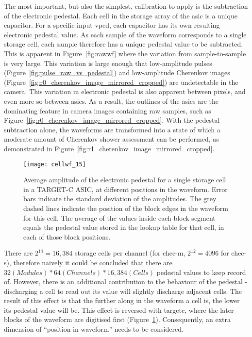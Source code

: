 The most important, but also the simplest, calibration to apply is the subtraction of the electronic pedestal. Each cell in the storage array of the \gls{asic} is a unique capacitor. For a specific input \gls{vped}, each capacitor has its own resulting electronic pedestal value. As each sample of the waveform corresponds to a single storage cell, each sample therefore has a unique pedestal value to be subtracted. This is apparent in Figure~\ref{fig:rawwf} where the variation from sample-to-sample is very large. This variation is large enough that low-amplitude pulses (Figure~\ref{fig:pulse_raw_vs_pedestal}) and low-amplitude Cherenkov images (Figure~\ref{fig:r0_cherenkov_image_mirrored_cropped}) are undetectable in the camera. This variation in electronic pedestal is also apparent between pixels, and even more so between \glspl{asic}. As a result, the outlines of the \glspl{asic} are the dominating feature in camera images containing raw samples, such as Figure~\ref{fig:r0_cherenkov_image_mirrored_cropped}. With the pedestal subtraction alone, the waveforms are transformed into a state of which a moderate amount of Cherenkov shower assessment can be performed, as demonstrated in Figure~\ref{fig:r1_cherenkov_image_mirrored_cropped}.

\begin{figure}
	\centering
    \texttt{[image: cellwf\_15]} 
	\caption[Storage-cell-amplitude dependence on position in the waveform.]{Average amplitude of the electronic pedestal for a single storage cell in a TARGET-C ASIC, at different positions in the waveform. Error bars indicate the standard deviation of the amplitudes. The grey dashed lines indicate the position of the block edges in the waveform for this cell. The average of the values inside each block segment equals the pedestal value stored in the lookup table for that cell, in each of those block positions.} 
	\label{fig:cellwf}
\end{figure}

There are $2^{14} = 16,384$ storage cells per channel (for \gls{chec-m}, $2^{12} = 4096$ for \gls{chec-s}), therefore naively it could be concluded that there are $32 (Modules) * 64 (Channels) * 16,384 (Cells)$ pedestal values to keep record of. However, there is an additional contribution to the behaviour of the pedestal - discharging a cell to read out its value will slightly discharge adjacent cells. The result of this effect is that the further along in the waveform a cell is, the lower its pedestal value will be. This effect is reversed with \gls{targetc}, where the later blocks of the waveform are digitised first (Figure~\ref{fig:cellwf}). Consequently, an extra dimension of ``position in waveform'' needs to be considered.

